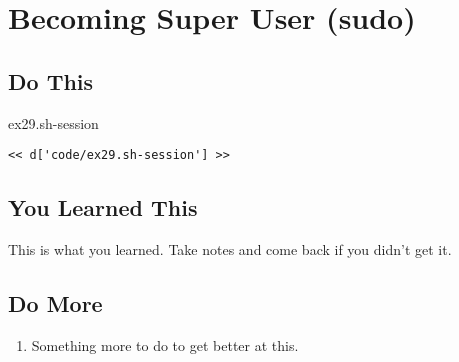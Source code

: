 \chapter{Becoming Super User (sudo)}

\section{Do This}

\begin{code}{ex29.sh-session}
\begin{Verbatim}
<< d['code/ex29.sh-session'] >>
\end{Verbatim}
\end{code}


\section{You Learned This}

This is what you learned.  Take notes and come back if you didn't get it.

\section{Do More}

\begin{enumerate}
\item Something more to do to get better at this.
\end{enumerate}

